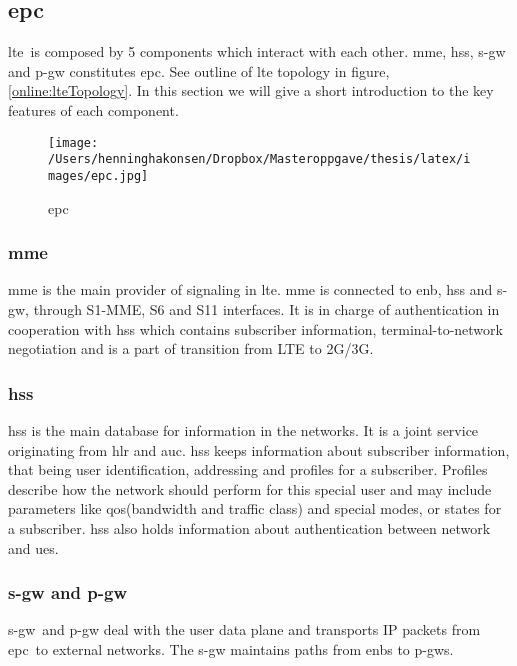 \documentclass[USenglish]{ifimaster}  %
\begin{document}
\subsection{\acrshort{epc}}
\acrshort{lte} is composed by 5 components which interact with each other. \acrshort{mme}, \acrshort{hss}, \acrshort{s-gw} and \acrshort{p-gw} constitutes \acrfull{epc}. See outline of \acrshort{lte} topology in figure, \vref{online:lteTopology}. In this section we will give a short introduction to the key features of each component.

\begin{figure}[H]
  \centering\texttt{[image: /Users/henninghakonsen/Dropbox/Masteroppgave/thesis/latex/images/epc.jpg]}
  \caption{\acrlong{epc} \cite{online:lteTopology}}
  \label{online:lteTopology}
\end{figure}

\subsubsection{\acrshort{mme}}
\acrfull{mme} is the main provider of signaling in \acrshort{lte}. \acrshort{mme} is connected to \acrshort{enb}, \acrshort{hss} and \acrshort{s-gw}, through S1-MME, S6 and S11 interfaces. It is in charge of authentication in cooperation with \acrshort{hss} which contains subscriber information, terminal-to-network negotiation and is a part of transition from LTE to 2G/3G.

\subsubsection{\acrshort{hss}}
\acrfull{hss} is the main database for information in the networks. It is a joint service originating from \acrfull{hlr} and \acrfull{auc}. \acrshort{hss} keeps information about subscriber information, that being user identification, addressing and profiles for a subscriber. Profiles describe how the network should perform for this special user and may include parameters like \acrshort{qos}(bandwidth and traffic class) and special modes, or states for a subscriber.
\newline
\acrshort{hss} also holds information about authentication between network and \acrshort{ue}s.

\subsubsection{\acrshort{s-gw} and \acrshort{p-gw}}
\acrfull{s-gw} and \acrfull{p-gw} deal with the user data plane and transports IP packets from \acrshort{epc} to external networks. The \acrshort{s-gw} maintains paths from \acrshort{enb}s to \acrshort{p-gw}s.
\end{document}

